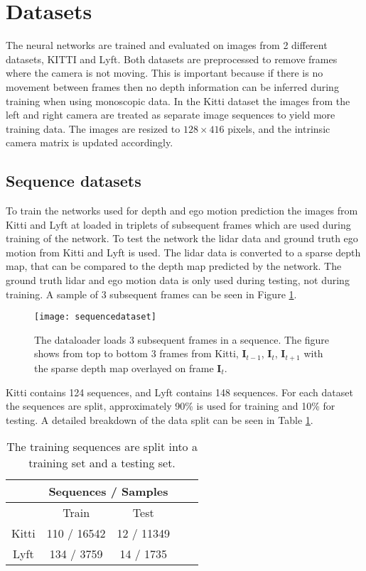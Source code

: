 \section{Datasets}

The neural networks are trained and evaluated on images from 2 different datasets, KITTI\cite{kitti} and Lyft\cite{lyft2019}. Both datasets are preprocessed to remove frames where the camera is not moving. This is important because if there is no movement between frames then no depth information can be inferred during training when using monoscopic data. In the Kitti dataset the images from the left and right camera are treated as separate image sequences to yield more training data. The images are resized to $128\times 416$ pixels, and the intrinsic camera matrix is updated accordingly.

\subsection{Sequence datasets}

To train the networks used for depth and ego motion prediction the images from Kitti and Lyft at loaded in triplets of subsequent frames which are used during training of the network. To test the network the lidar data and ground truth ego motion from Kitti and Lyft is used. The lidar data is converted to a sparse depth map, that can be compared to the depth map predicted by the network. The ground truth lidar and ego motion data is only used during testing, not during training. A sample of 3 subsequent frames can be seen in Figure \ref{fig:sequencedataset}.

\begin{figure}[H]
	\centering
	\texttt{[image: sequencedataset]}
	\caption{The dataloader loads 3 subsequent frames in a sequence. The figure shows from top to bottom 3 frames from Kitti, $\textbf{I}_{t-1}$, $\textbf{I}_t$, $\textbf{I}_{t+1}$ with the sparse depth map overlayed on frame $\textbf{I}_t$.}
	\label{fig:sequencedataset}
\end{figure}

Kitti contains 124 sequences, and Lyft contains 148 sequences. For each dataset the sequences are split, approximately 90\% is used for training and 10\% for testing. A detailed breakdown of the data split can be seen in Table \ref{table:datasets}.

\begin{table}[H]
	\centering
	\begin{tabular}{ |c|c|c|c|c| } 
		\hline
		&\multicolumn{2}{c|}{Sequences / Samples} \\ 
		\hline
		& Train & Test \\ 
		\hline
		Kitti & 110 / 16542 & 12 / 11349 \\ 
		\hline
		Lyft & 134 / 3759 & 14 / 1735 \\ 
		\hline
	\end{tabular}
	\caption{The training sequences are split into a training set and a testing set.}
	\label{table:datasets}
\end{table}

